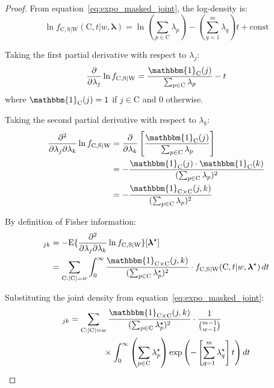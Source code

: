 \documentclass[pdflatex,sn-mathphys-num,Numbered]{sn-jnl}
\newcommand{\RV}[1]{\mathrm{#1}}
\newcommand{\Expect}[1]{\mathrm{E}\{#1\}}
\newcommand{\sv}{\RV{S}}           %
\newcommand{\cand}{\RV{C}}         %
\newcommand{\rvcand}{\RV{C}}       %
\newcommand{\tparam}[1]{{#1}^{\star}}  %
\newcommand{\infomatrx}{\mathcal{I}}
\newcommand{\pdf}{f}
\renewcommand{\vec}[1]{\boldsymbol{#1}}
\newcommand{\SetIndicator}[1]{\mathbbm{1}_{#1}}
\theoremstyle{thmstyleone}
\theoremstyle{thmstylethree}
\theoremstyle{thmstyletwo}
\begin{document}
\begin{proof}
From equation~\eqref{eq:expo_masked_joint}, the log-density is:
\begin{equation}
\ln \pdf_{\rvcand, \sv | \RV{W}}(\cand, t | w, \vec{\lambda}) = \ln\left(\sum_{p \in \cand} \lambda_p\right) - \left(\sum_{q=1}^{m} \lambda_q\right) t + \text{const}
\end{equation}

Taking the first partial derivative with respect to $\lambda_j$:
\begin{equation}
\frac{\partial}{\partial \lambda_j} \ln \pdf_{\rvcand, \sv | \RV{W}} = \frac{\SetIndicator{\cand}(j)}{\sum_{p \in \cand} \lambda_p} - t
\end{equation}
where $\SetIndicator{\cand}(j) = 1$ if $j \in \cand$ and $0$ otherwise.

Taking the second partial derivative with respect to $\lambda_k$:
\begin{align}
\frac{\partial^2}{\partial \lambda_j \partial \lambda_k} \ln \pdf_{\rvcand, \sv | \RV{W}} &= \frac{\partial}{\partial \lambda_k}\left[\frac{\SetIndicator{\cand}(j)}{\sum_{p \in \cand} \lambda_p}\right] \nonumber\\
&= -\frac{\SetIndicator{\cand}(j) \cdot \SetIndicator{\cand}(k)}{(\sum_{p \in \cand} \lambda_p)^2} \nonumber\\
&= -\frac{\SetIndicator{\cand \times \cand}(j,k)}{(\sum_{p \in \cand} \lambda_p)^2}
\end{align}

By definition of Fisher information:
\begin{align}
[\infomatrx(\tparam{\vec{\lambda}} | w)]_{jk} &= -\Expect{\frac{\partial^2}{\partial \lambda_j \partial \lambda_k} \ln \pdf_{\rvcand, \sv | \RV{W}}}[\tparam{\vec{\lambda}}] \nonumber\\
&= \sum_{\cand: |\cand|=w} \int_0^\infty \frac{\SetIndicator{\cand \times \cand}(j,k)}{(\sum_{p \in \cand} \tparam{\lambda}_p)^2} \cdot \pdf_{\rvcand, \sv | \RV{W}}(\cand, t | w, \tparam{\vec{\lambda}}) \, dt
\end{align}

Substituting the joint density from equation~\eqref{eq:expo_masked_joint}:
\begin{align}
[\infomatrx(\tparam{\vec{\lambda}} | w)]_{jk} &= \sum_{\cand: |\cand|=w} \frac{\SetIndicator{\cand \times \cand}(j,k)}{(\sum_{p \in \cand} \tparam{\lambda}_p)^2} \cdot \frac{1}{\binom{m-1}{w-1}} \nonumber\\
&\qquad\qquad \times \int_0^\infty \left(\sum_{p \in \cand} \tparam{\lambda}_p\right) \exp\left(-\left[\sum_{q=1}^{m} \tparam{\lambda}_q\right] t\right) dt
\end{align}


\end{proof}
\end{document}

